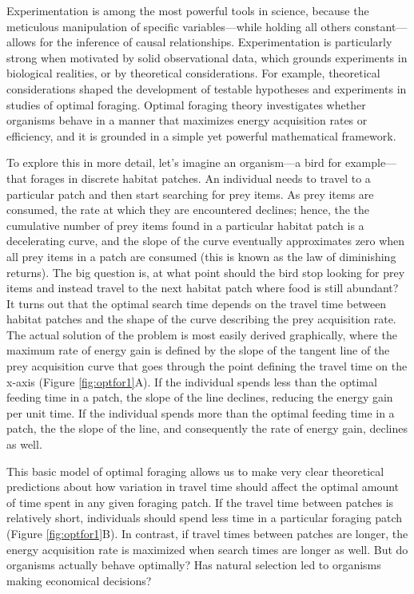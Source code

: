 \documentclass[
]{book}
\begin{document}
Experimentation is among the most powerful tools in science, because the meticulous manipulation of specific variables---while holding all others constant---allows for the inference of causal relationships. Experimentation is particularly strong when motivated by solid observational data, which grounds experiments in biological realities, or by theoretical considerations. For example, theoretical considerations shaped the development of testable hypotheses and experiments in studies of optimal foraging. Optimal foraging theory investigates whether organisms behave in a manner that maximizes energy acquisition rates or efficiency, and it is grounded in a simple yet powerful mathematical framework.

To explore this in more detail, let's imagine an organism---a bird for example---that forages in discrete habitat patches. An individual needs to travel to a particular patch and then start searching for prey items. As prey items are consumed, the rate at which they are encountered declines; hence, the the cumulative number of prey items found in a particular habitat patch is a decelerating curve, and the slope of the curve eventually approximates zero when all prey items in a patch are consumed (this is known as the law of diminishing returns). The big question is, at what point should the bird stop looking for prey items and instead travel to the next habitat patch where food is still abundant? It turns out that the optimal search time depends on the travel time between habitat patches and the shape of the curve describing the prey acquisition rate. The actual solution of the problem is most easily derived graphically, where the maximum rate of energy gain is defined by the slope of the tangent line of the prey acquisition curve that goes through the point defining the travel time on the x-axis (Figure \ref{fig:optfor1}A). If the individual spends less than the optimal feeding time in a patch, the slope of the line declines, reducing the energy gain per unit time. If the individual spends more than the optimal feeding time in a patch, the the slope of the line, and consequently the rate of energy gain, declines as well.

This basic model of optimal foraging allows us to make very clear theoretical predictions about how variation in travel time should affect the optimal amount of time spent in any given foraging patch. If the travel time between patches is relatively short, individuals should spend less time in a particular foraging patch (Figure \ref{fig:optfor1}B). In contrast, if travel times between patches are longer, the energy acquisition rate is maximized when search times are longer as well. But do organisms actually behave optimally? Has natural selection led to organisms making economical decisions?
\end{document}
